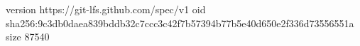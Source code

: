 version https://git-lfs.github.com/spec/v1
oid sha256:9c3db0daea839bddb32c7ccc3c42f7b57394b77b5e40d650e2f336d73556551a
size 87540

